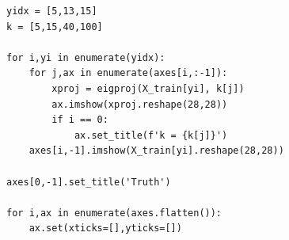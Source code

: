 \documentclass{article}
\begin{document}
\begin{enumerate}
\begin{verbatim}
yidx = [5,13,15]
k = [5,15,40,100]

for i,yi in enumerate(yidx):
    for j,ax in enumerate(axes[i,:-1]):
        xproj = eigproj(X_train[yi], k[j])
        ax.imshow(xproj.reshape(28,28))
        if i == 0:
            ax.set_title(f'k = {k[j]}')
    axes[i,-1].imshow(X_train[yi].reshape(28,28))
    
axes[0,-1].set_title('Truth')

for i,ax in enumerate(axes.flatten()):
    ax.set(xticks=[],yticks=[])
        \end{verbatim}
\end{enumerate}
\end{document}
